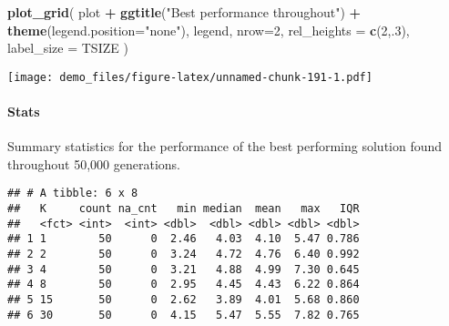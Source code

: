 \documentclass[]{book}
\newenvironment{Shaded}{\begin{snugshade}}{\end{snugshade}}
\newcommand{\DataTypeTok}[1]{\textcolor[rgb]{0.13,0.29,0.53}{#1}}
\newcommand{\DecValTok}[1]{\textcolor[rgb]{0.00,0.00,0.81}{#1}}
\newcommand{\KeywordTok}[1]{\textcolor[rgb]{0.13,0.29,0.53}{\textbf{#1}}}
\newcommand{\NormalTok}[1]{#1}
\newcommand{\OperatorTok}[1]{\textcolor[rgb]{0.81,0.36,0.00}{\textbf{#1}}}
\newcommand{\OtherTok}[1]{\textcolor[rgb]{0.56,0.35,0.01}{#1}}
\newcommand{\StringTok}[1]{\textcolor[rgb]{0.31,0.60,0.02}{#1}}
\let\oldparagraph\paragraph
\renewcommand{\paragraph}[1]{\oldparagraph{#1}\mbox{}}
\begin{document}
\begin{Shaded}
\begin{Highlighting}[]
\KeywordTok{plot_grid}\NormalTok{(}
\NormalTok{  plot }\OperatorTok{+}
\StringTok{    }\KeywordTok{ggtitle}\NormalTok{(}\StringTok{"Best performance throughout"}\NormalTok{) }\OperatorTok{+}
\StringTok{    }\KeywordTok{theme}\NormalTok{(}\DataTypeTok{legend.position=}\StringTok{"none"}\NormalTok{),}
\NormalTok{  legend,}
  \DataTypeTok{nrow=}\DecValTok{2}\NormalTok{,}
  \DataTypeTok{rel_heights =} \KeywordTok{c}\NormalTok{(}\DecValTok{2}\NormalTok{,.}\DecValTok{3}\NormalTok{),}
  \DataTypeTok{label_size =}\NormalTok{ TSIZE}
\NormalTok{)}
\end{Highlighting}
\end{Shaded}

\texttt{[image: demo\_files/figure-latex/unnamed-chunk-191-1.pdf]}

\hypertarget{stats-82}{%
\paragraph{Stats}\label{stats-82}}

Summary statistics for the performance of the best performing solution found throughout 50,000 generations.

\begin{Shaded}
\end{Shaded}

\begin{verbatim}
## # A tibble: 6 x 8
##   K     count na_cnt   min median  mean   max   IQR
##   <fct> <int>  <int> <dbl>  <dbl> <dbl> <dbl> <dbl>
## 1 1        50      0  2.46   4.03  4.10  5.47 0.786
## 2 2        50      0  3.24   4.72  4.76  6.40 0.992
## 3 4        50      0  3.21   4.88  4.99  7.30 0.645
## 4 8        50      0  2.95   4.45  4.43  6.22 0.864
## 5 15       50      0  2.62   3.89  4.01  5.68 0.860
## 6 30       50      0  4.15   5.47  5.55  7.82 0.765
\end{verbatim}
\end{document}

